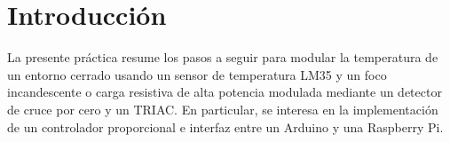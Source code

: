 %
%


\section{Introducción}%
\label{seq:introduction}
La presente práctica resume los pasos a seguir para modular la temperatura de un entorno cerrado usando un sensor de temperatura LM35 y un foco incandescente o carga resistiva de alta potencia modulada mediante un detector de cruce por cero y un TRIAC.
En particular, se interesa en la implementación de un controlador proporcional e interfaz \IIC entre un Arduino y una Raspberry Pi.




